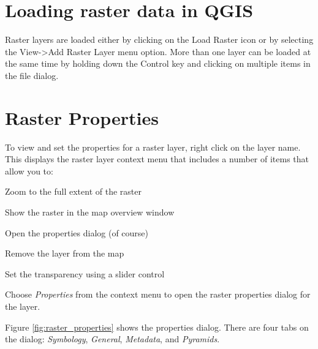 \section{Loading raster data in QGIS}
Raster layers are
loaded either by clicking on the Load Raster icon or by selecting the View->Add
Raster Layer menu option. More than one layer can be loaded at the same time by
holding down the Control key and clicking on multiple items in the file
dialog.
	
\section{Raster Properties}

To
view and set the properties for a raster layer, right click on the layer name.
This displays the raster layer context menu that includes a number of items that
allow you to:
\begin{compactitem}
\item Zoom to the full extent of the raster
\item Show the raster in the map overview window
\item Open the properties dialog (of course)
\item Remove the layer from the map
\item Set the transparency using a slider control
\end{compactitem}
Choose \textsl{Properties} from the context menu to open the raster properties
dialog for the layer.


Figure \ref{fig:raster_properties} shows the properties dialog. There are four tabs on the dialog: \textsl{Symbology}, \textsl{General}, \textsl{Metadata}, and \textsl{Pyramids}.

